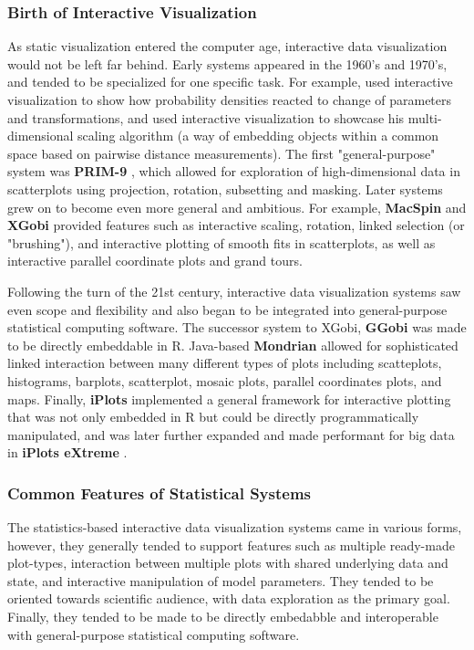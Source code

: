 \documentclass[12pt,a4paper]{article}
\begin{document}
\subsubsection{Birth of Interactive Visualization}

As static visualization entered the computer age, interactive data visualization would not be left far behind. Early systems appeared in the 1960's and 1970's, and tended to be specialized for one specific task. For example, \cite{fowlkes1969} used interactive visualization to show how probability densities reacted to change of parameters and transformations, and \cite{kruskal1964} used interactive visualization to showcase his multi-dimensional scaling algorithm (a way of embedding objects within a common space based on pairwise distance measurements). The first "general-purpose" system was \textbf{PRIM-9} \citep{fisherkeller1974}, which allowed for exploration of high-dimensional data in scatterplots using projection, rotation, subsetting and masking. Later systems grew on to become even more general and ambitious. For example, \textbf{MacSpin} \citep{donoho1988} and \textbf{XGobi} \citep{swayne1998} provided features such as interactive scaling, rotation, linked selection (or "brushing"), and interactive plotting of smooth fits in scatterplots, as well as interactive parallel coordinate plots and grand tours.

Following the turn of the 21st century, interactive data visualization systems saw even scope and flexibility and also began to be integrated into general-purpose statistical computing software. The successor system to XGobi, \textbf{GGobi} \citep{swayne2003} was made to be directly embeddable in R. Java-based \textbf{Mondrian} \citep{theus2002} allowed for sophisticated linked interaction between many different types of plots including scatteplots, histograms, barplots, scatterplot, mosaic plots, parallel coordinates plots, and maps. Finally, \textbf{iPlots} \citep{urbanek2003} implemented a general framework for interactive plotting that was not only embedded in R but could be directly programmatically manipulated, and was later further expanded and made performant for big data in \textbf{iPlots eXtreme} \citep{urbanek2011}.

\subsubsection{Common Features of Statistical Systems}

The statistics-based interactive data visualization systems came in various forms, however, they generally tended to support features such as multiple ready-made plot-types, interaction between multiple plots with shared underlying data and state, and interactive manipulation of model parameters. They tended to be oriented towards scientific audience, with data exploration as the primary goal. Finally, they tended to be made to be directly embedabble and interoperable with general-purpose statistical computing software.      
\end{document}
